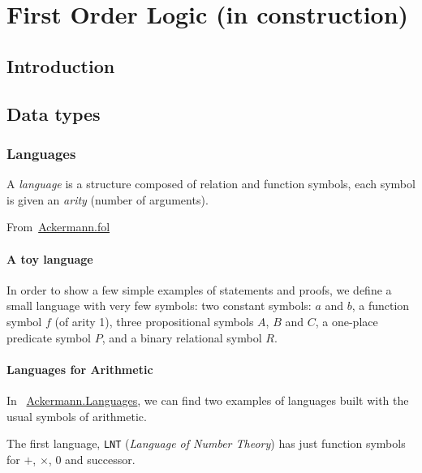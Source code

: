 \chapter{First Order Logic (in construction)}
\label{chap:fol}

\section{Introduction}

\section{Data types}

\subsection{Languages}

A \emph{language} is a structure composed of relation and function symbols, each symbol is given an \emph{arity} (number of arguments).

From~\href{../theories/html/hydras.Ackermann.fol.html}{Ackermann.fol}

\subsubsection{A toy language}
In order to show a few simple examples of statements and proofs, we define a small language with very few symbols:
two constant symbols: $a$ and $b$, a function symbol $f$ (of arity 1), three propositional symbols $A$, $B$ and $C$, a one-place predicate symbol $P$, and a binary relational symbol $R$.


\subsubsection{Languages for Arithmetic}






In ~\href{../theories/html/hydras.Ackermann.Languages.html}{Ackermann.Languages}, we can find two examples of languages built with the usual symbols of arithmetic.

The first language, \texttt{LNT} (\emph{Language of Number Theory}) has just function symbols for $+$, $\times$, $0$ and successor.




